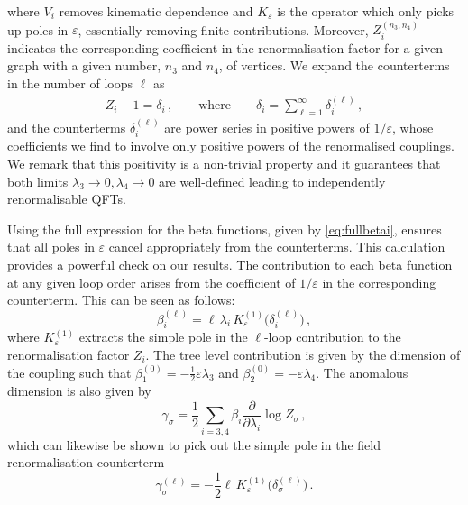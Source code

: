 \documentclass[a4paper,11pt]{article}
\begin{document}
where $V_i$ removes kinematic dependence and $K_\varepsilon$ is the operator which only picks up poles in $\varepsilon$, essentially removing finite contributions. Moreover, $Z_i^{(n_3,n_4)}$ indicates the corresponding coefficient in the renormalisation factor for a given graph with a given number, $n_3$ and $n_4$, of vertices. We expand the counterterms in the number of loops $\ell$ as 
\begin{eqnarray}
    Z_i - 1 =   \delta_i \,, \qquad  \text{where} \qquad  \delta_i = \sum_{\ell=1}^\infty \delta_i^{(\ell)} \,,
\end{eqnarray}
and the counterterms $\delta_i^{(\ell)}$ are power series in positive powers of $1/\varepsilon$, whose coefficients we find to involve only positive powers of the renormalised couplings.  We remark that this positivity is a non-trivial property and it guarantees that both limits $\lambda_3\to 0,\lambda_4\to 0$ are well-defined leading to independently renormalisable QFTs.

Using the full expression for the beta functions, given by \cref{eq:fullbetai}, ensures that all poles in $\varepsilon$ cancel appropriately from the counterterms. This calculation provides a powerful check on our results. The contribution to each beta function at any given loop order arises from the coefficient of $1/\varepsilon$ in the corresponding counterterm. This can be seen as follows:
\begin{equation}\label{eq:beta_coeffs}
     \beta^{(\ell)}_i = \ell\,\lambda_i \,K_\varepsilon^{(1)} \bigl( \delta_{i}^{(\ell)} \bigr)\,,
\end{equation}
where $K_\varepsilon^{(1)}$ extracts the simple pole in the $\ell$-loop contribution to the renormalisation factor $Z_i$. The tree level contribution is given by the dimension of the coupling such that $\beta^{(0)}_1=-\frac12\varepsilon\lambda_3$ and $\beta^{(0)}_2=-\varepsilon \lambda_4$. The anomalous dimension is also given by 
\begin{equation}\label{eq:fullAnomDim}
    \gamma_\sigma =  \frac12 \sum_{i=3,4} \beta_i \frac{\partial}{\partial \lambda_i} \log Z_{\sigma} \,,
\end{equation}
which can likewise be shown to pick out the simple pole in the field renormalisation counterterm
\begin{equation}\label{eq:simpleAnomDim}
    \gamma^{(\ell)}_\sigma = - \frac12 \ell \, K_\varepsilon^{(1)} \bigl( \delta_{\sigma}^{(\ell)} \bigr) \,.
\end{equation}
\end{document}

